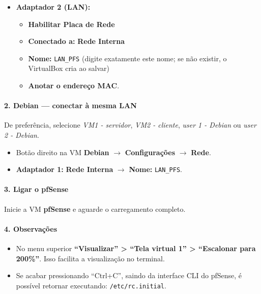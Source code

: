 \begin{itemize}
  \item \textbf{Adaptador 2 (LAN):}
  \begin{itemize}
    \item \textbf{Habilitar Placa de Rede}
    \item \textbf{Conectado a:} \textbf{Rede Interna}
    \item \textbf{Nome:} \texttt{LAN\_PFS} (digite exatamente este nome; se não existir, o VirtualBox cria ao salvar)
    \item \textbf{Anotar o endereço MAC}.
  \end{itemize}
\end{itemize}


\paragraph{2. Debian --- conectar à mesma LAN}

\begin{notebox}
De preferência, selecione \textit{VM1 - servidor}, \textit{VM2 - cliente}, \textit{user 1 - Debian} ou \textit{user 2 - Debian}.
\end{notebox}

\begin{itemize}
  \item Botão direito na VM \textbf{Debian} $\rightarrow$ \textbf{Configurações} $\rightarrow$ \textbf{Rede}.
  \item \textbf{Adaptador 1:} \textbf{Rede Interna} $\rightarrow$ \textbf{Nome:} \texttt{LAN\_PFS}.
\end{itemize}


\paragraph{3. Ligar o pfSense} Inicie a VM \textbf{pfSense} e aguarde o carregamento completo.


\paragraph{4. Observações}
\begin{itemize}
  \item No menu superior \textbf{``Visualizar'' > ``Tela virtual 1'' > ``Escalonar para 200\%''}. Isso facilita a visualização no terminal.
  \item Se acabar pressionando ``Ctrl+C'', saindo da interface CLI do pfSense, é possível retornar executando: \texttt{/etc/rc.initial}.
\end{itemize}

